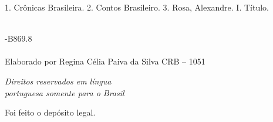 {\hspace{20pt}\parbox{190pt}{1. Crônicas Brasileira. 2. Contos Brasileiro. 3. Rosa, Alexandre. I. Título.}\\[6pt]

\hspace{188pt}-B869.8\\

\hrulefill\\
\noindent{}Elaborado por Regina Célia Paiva da Silva CRB -- 1051 


\vfill\textit{Direitos reservados em l\'ingua\\ portuguesa somente para o Brasil}\\\medskip

%
\bigskip
Foi feito o depósito legal.\\\endgroup
\pagebreak\raggedleft
\titulagem

{\Large \autor \par\vspace{1.5ex}}
\vspace{8.5mm}

}
